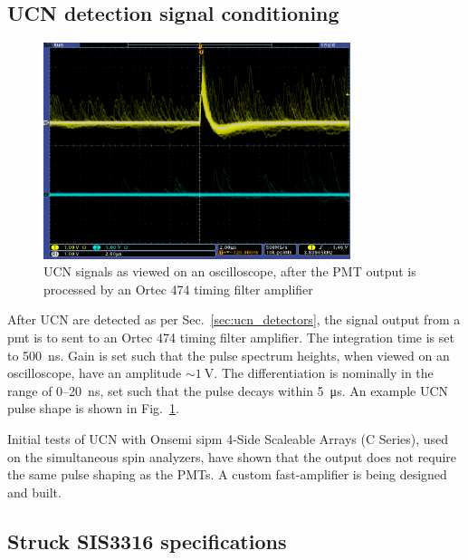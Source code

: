 
\subsection{UCN detection signal conditioning}\label{sec:signal_conditioning}


 \begin{figure}
    \centering
    \includegraphics[width=0.8\textwidth]{figures/pmt_scope.png}
    \caption
     {UCN signals as viewed on an oscilloscope, after the PMT output is processed by an Ortec 474 timing filter amplifier}
    \label{fig:scope_image}
\end{figure}

After UCN are detected as per Sec.~\ref{sec:ucn_detectors}, the signal output from a \gls*{pmt} is to sent to an Ortec 474 timing filter amplifier. The integration time is set to \qty{500}{\nano\second}. Gain is set such that the pulse spectrum heights, when viewed on an oscilloscope, have an amplitude $\sim\qty{1}{\volt}$. The differentiation is nominally in the range of 0--\qty{20}{\nano\second}, set such that the pulse decays within \qty{5}{\micro \second}. An example UCN pulse shape is shown in Fig.~\ref{fig:scope_image}.

Initial tests of UCN with Onsemi \acrshort*{sipm} 4-Side Scaleable Arrays (C Series), used on the simultaneous spin analyzers, have shown that the output does not require the same pulse shaping as the PMTs. A custom fast-amplifier is being designed and built.


\subsection{Struck SIS3316 specifications}\label{sec:sis3316_specs}

